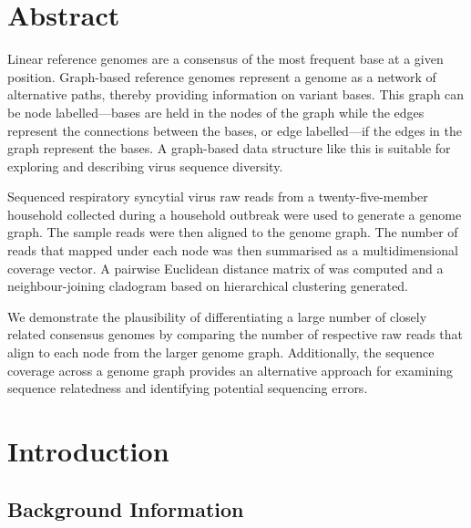 \documentclass[10pt, a4paper]{article}
\begin{document}
\section{Abstract}
\label{sec:org795d807}
\begin{ABSTRACT}
Linear reference genomes are a consensus of the most frequent base at a given
position.
Graph-based reference genomes represent a genome as a network of alternative
paths, thereby providing information on variant bases.
This graph can be node labelled—bases are held in the nodes of the graph while
the edges represent the connections between the bases, or edge labelled—if the
edges in the graph represent the bases. A graph-based data structure like this
is suitable for exploring and describing virus sequence diversity.

Sequenced respiratory syncytial virus raw reads from a twenty-five-member
household collected during a household outbreak were used to generate a genome
graph.
The sample reads were then aligned to the genome graph.
The number of reads that mapped under each node was then summarised as a
multidimensional coverage vector.
A pairwise Euclidean distance matrix of was computed and a neighbour-joining
cladogram based on hierarchical clustering generated.

We demonstrate the plausibility of differentiating a large number of closely
related consensus genomes by comparing the number of respective raw reads that
align to each node from the larger genome graph.
Additionally, the sequence coverage across a genome graph provides an
alternative approach for examining sequence relatedness and identifying
potential sequencing errors.
\end{ABSTRACT}
\setcounter{secnumdepth}{4}

\newpage

\setcounter{tocdepth}{5}
\tableofcontents


\newpage
\listoftables

\newpage
\listoffigures


\newpage
{}

\section{Introduction}
\label{sec:org0bbfdd5}
\subsection{Background Information}
\label{sec:org3365102}
\end{document}
